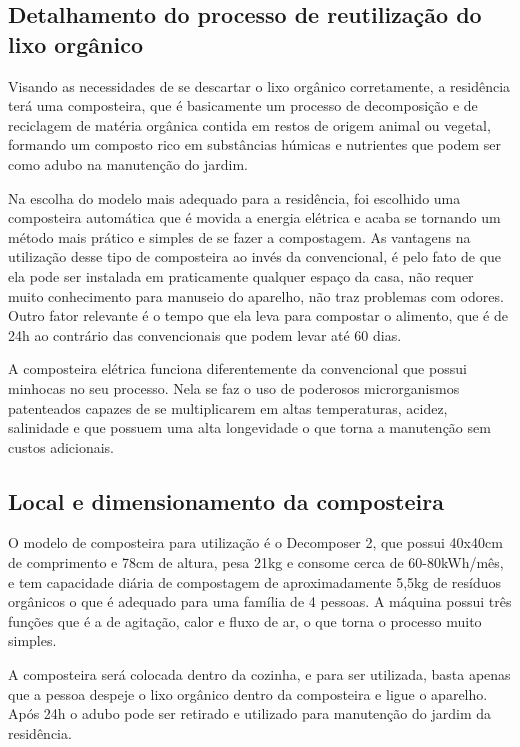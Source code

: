 \subsection{Detalhamento do processo de reutilização do lixo orgânico}

	Visando as necessidades de se descartar o lixo orgânico corretamente, a residência terá uma composteira, que é basicamente um processo de decomposição e de reciclagem de matéria orgânica contida em restos de origem animal ou vegetal, formando um composto rico em substâncias húmicas e nutrientes que podem ser como adubo na manutenção do jardim.

	Na escolha do modelo mais adequado para a residência, foi escolhido uma composteira automática que é movida a energia elétrica e acaba se tornando um método mais prático e simples de se fazer a compostagem. As vantagens na utilização desse tipo de composteira ao invés da convencional, é pelo fato de que ela pode ser instalada em praticamente qualquer espaço da casa, não requer muito conhecimento para manuseio do aparelho, não traz problemas com odores. Outro fator relevante é o tempo que ela leva para compostar o alimento, que é de 24h ao contrário das convencionais que podem levar até 60 dias.

	A composteira elétrica funciona diferentemente da convencional que possui minhocas no seu processo. Nela se faz o uso de poderosos microrganismos patenteados capazes de se multiplicarem em altas temperaturas, acidez, salinidade e que possuem uma alta longevidade o que torna a manutenção sem custos adicionais.

\subsection{Local e dimensionamento da composteira}

	O modelo de composteira para utilização é o Decomposer 2, que possui 40x40cm de comprimento e 78cm de altura, pesa 21kg e consome cerca de 60-80kWh/mês, e tem capacidade diária de compostagem de aproximadamente 5,5kg de resíduos orgânicos o que é adequado para uma família de 4 pessoas.  A máquina possui três funções que é a de agitação, calor e fluxo de ar, o que torna o processo muito simples.

	A composteira será colocada dentro da cozinha, e para ser utilizada, basta apenas que a pessoa despeje o lixo orgânico dentro da composteira e ligue o aparelho. Após 24h o adubo pode ser retirado e utilizado para manutenção do jardim da residência.


